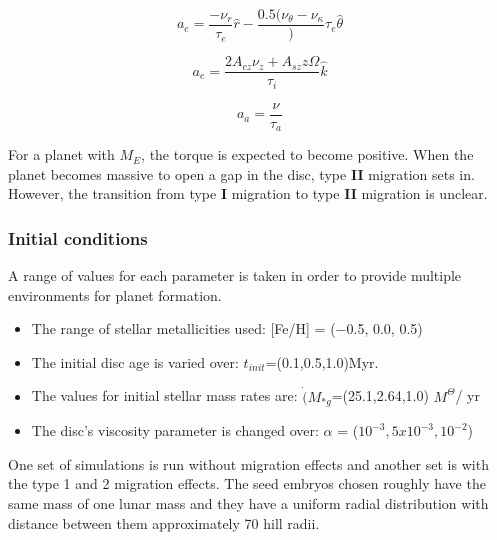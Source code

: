 \begin{equation}
{a_e}= \frac{-\nu_r}{\tau_e}\hat{r} - \frac{0.5(\nu_\theta - \nu_\kappa}){\tau_e}\hat{\theta}
\end{equation}

\begin{equation}
{a_e}=\frac{2A_{cz}\nu_z+A_{sz}z\Omega}{\tau_i}\hat{k}
\end{equation}

\begin{equation}
{a_a}=\frac{\nu}{\tau_a}
\end{equation}


\noindent
For a planet with $M_E$, the torque is expected to become positive. When the planet becomes massive to open a gap in the disc, type \textbf{II} migration sets in. However, the transition from type \textbf{I} migration to type  \textbf{II} migration is unclear. 




\subsubsection{Initial conditions} 
A range of values for each parameter is taken in order to provide multiple environments for planet formation. 
\begin{itemize}
\item The range of stellar metallicities used: [Fe/H] = (−0.5, 0.0, 0.5)
\item The initial disc age is varied over: $t_{init}$=(0.1,0.5,1.0)Myr. 
\item The values for initial stellar mass rates are: $\Dot(M_{* g}$=(25.1,2.64,1.0) $M^\Theta$/ yr
\item The disc's viscosity parameter is changed over: $\alpha$ =  ($10^{-3},5x10^{-3},10^{-2}$)
\end{itemize} 
One set of simulations is run without migration effects and another set is with the type 1 and 2 migration effects.
The seed embryos chosen roughly have the same mass of one lunar mass and they have a uniform radial distribution with distance between them approximately 70 hill radii.
 
